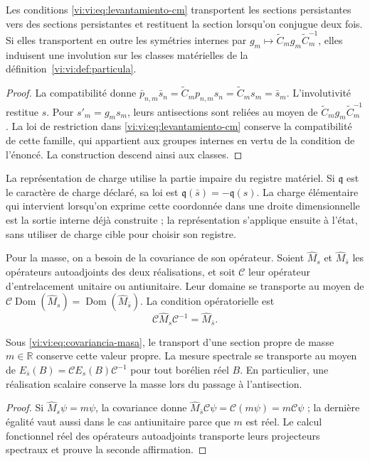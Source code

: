 \begin{proposition}
\label{vi:vi:prop:antiseccion-persistente}
Les conditions \eqref{vi:vi:eq:levantamiento-cm} transportent les sections
persistantes vers des sections persistantes et restituent la section lorsqu’on
conjugue deux fois. Si elles transportent en outre les symétries internes par
$g_m\mapsto\widetilde C_mg_m\widetilde C_m^{-1}$, elles induisent une
involution sur les classes matérielles de la
définition~\ref{vi:vi:def:particula}.
\end{proposition}
\begin{proof}
La compatibilité donne
$\bar p_{n,m}\bar s_n=\widetilde C_mp_{n,m}s_n
=\widetilde C_ms_m=\bar s_m$.
L’involutivité restitue $s$. Pour $s'_m=g_ms_m$, leurs
antisections sont reliées au moyen de
$\widetilde C_mg_m\widetilde C_m^{-1}$. La loi de restriction
dans \eqref{vi:vi:eq:levantamiento-cm} conserve la compatibilité de cette
famille, qui appartient aux groupes internes en vertu de la condition de
l’énoncé. La construction descend ainsi aux classes.
\end{proof}

La représentation de charge utilise la partie impaire du registre
matériel. Si $\mathfrak q$ est le caractère de charge déclaré, sa
loi est $\mathfrak q(\bar s)=-\mathfrak q(s)$. La charge élémentaire
qui intervient lorsqu’on exprime cette coordonnée dans une droite dimensionnelle est
la sortie interne déjà construite ; la représentation s’applique ensuite
à l’état, sans utiliser de charge cible pour choisir son registre.

Pour la masse, on a besoin de la covariance de son opérateur. Soient
$\widehat M_s$ et $\widehat M_{\bar s}$ les opérateurs autoadjoints
des deux réalisations, et soit $\mathcal C$ leur opérateur d’entrelacement
unitaire ou antiunitaire. Leur domaine se transporte au moyen de
$\mathcal C\operatorname{Dom}(\widehat M_s)
=\operatorname{Dom}(\widehat M_{\bar s})$. La condition opératorielle est
\begin{equation}
 \mathcal C\widehat M_s\mathcal C^{-1}
 =\widehat M_{\bar s}.
 \label{vi:vi:eq:covariancia-masa}
\end{equation}

\begin{proposition}
\label{vi:vi:prop:masa-conjugada}
Sous \eqref{vi:vi:eq:covariancia-masa}, le transport d’une section
propre de masse $m\in\mathbb R$ conserve cette valeur propre. La mesure
spectrale se transporte au moyen de
$E_{\bar s}(B)=\mathcal C E_s(B)\mathcal C^{-1}$ pour tout
borélien réel $B$. En particulier, une réalisation scalaire conserve
la masse lors du passage à l’antisection.
\end{proposition}
\begin{proof}
Si $\widehat M_s\psi=m\psi$, la covariance donne
$\widehat M_{\bar s}\mathcal C\psi
=\mathcal C(m\psi)=m\mathcal C\psi$ ; la dernière égalité
vaut aussi dans le cas antiunitaire parce que $m$ est réel. Le calcul
fonctionnel réel des opérateurs autoadjoints transporte leurs
projecteurs spectraux et prouve la seconde affirmation.
\end{proof}

